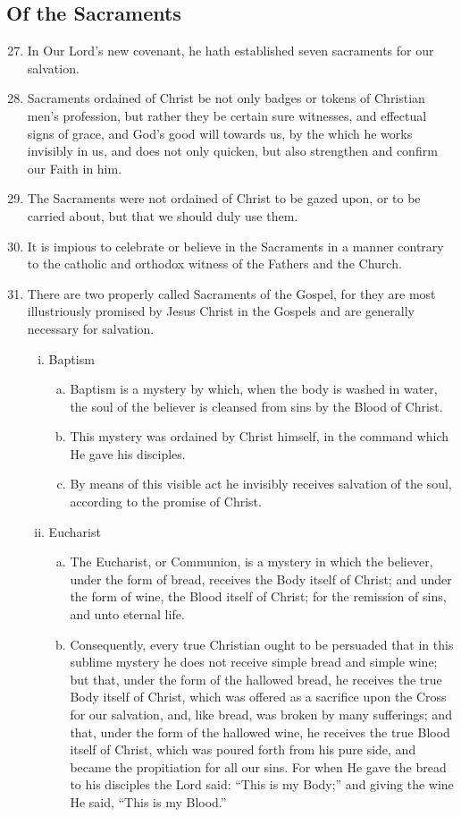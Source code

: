 \subsection{Of the Sacraments}
\begin{enumerate}
\setcounter{enumi}{26}
	\item In Our Lord's new covenant, he hath established seven sacraments for our salvation.
	\item Sacraments ordained of Christ be not only badges or tokens of Christian men's profession, but rather they be certain sure witnesses, and effectual signs of grace, and God's good will towards us, by the which he works invisibly in us, and does not only quicken, but also strengthen and confirm our Faith in him.
	\item The Sacraments were not ordained of Christ to be gazed upon, or to be carried about, but that we should duly use them.
	\item It is impious to celebrate or believe in the Sacraments in a manner contrary to the catholic and orthodox witness of the Fathers and the Church.
	\item There are two properly called Sacraments of the Gospel, for they are most illustriously promised by Jesus Christ in the Gospels and are generally necessary for salvation.
	\begin{enumerate}[i.]
		\item Baptism
			\begin{enumerate}[a.]
				\item Baptism is a mystery by which, when the body is washed in water, the soul of the believer is cleansed from sins by the Blood of Christ.
				\item This mystery was ordained by Christ himself, in the command which He gave his disciples.
				\item By means of this visible act he invisibly receives salvation of the soul, according to the promise of Christ.
			\end{enumerate}
		\item Eucharist
			\begin{enumerate}[a.]
				\item The Eucharist, or Communion, is a mystery in which the believer, under the form of bread, receives the Body itself of Christ; and under the form of wine, the Blood itself of Christ; for the remission of sins, and unto eternal life.
				\item Consequently, every true Christian ought to be persuaded that in this sublime mystery he does not receive simple bread and simple wine; but that, under the form of the hallowed bread, he receives the true Body itself of Christ, which was offered as a sacrifice upon the Cross for our salvation, and, like bread, was broken by many sufferings; and that, under the form of the hallowed wine, he receives the true Blood itself of Christ, which was poured forth from his pure side, and became the propitiation for all our sins. For when He gave the bread to his disciples the Lord said: ``This is my Body;'' and giving the wine He said, ``This is my Blood.''

\end{enumerate}
\end{enumerate}
\end{enumerate}

